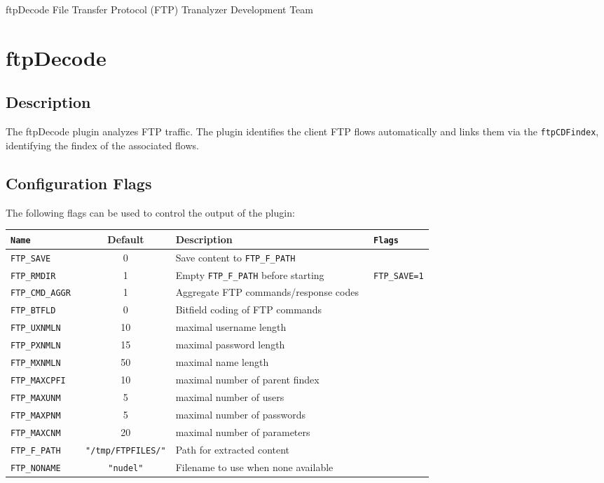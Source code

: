 \documentclass[documentation]{subfiles}
\begin{document}
\trantitle
    {ftpDecode}
    {File Transfer Protocol (FTP)}
    {Tranalyzer Development Team} %

\section{ftpDecode}\label{s:ftpDecode}

\subsection{Description}
The ftpDecode plugin analyzes FTP traffic.
The plugin identifies the client FTP flows automatically and links them via the {\tt ftpCDFindex}, identifying
the findex of the associated flows.

\subsection{Configuration Flags}
The following flags can be used to control the output of the plugin:
\begin{longtable}{>{\tt}lcl>{\tt\small}l}
    \toprule
    {\bf Name} & {\bf Default} & {\bf Description} & {\bf Flags}\\
    \midrule\endhead%
    FTP\_SAVE      &  0 & Save content to {\tt FTP\_F\_PATH}       & \\
    FTP\_RMDIR     &  1 & Empty {\tt FTP\_F\_PATH} before starting & FTP\_SAVE=1\\
    FTP\_CMD\_AGGR &  1 & Aggregate FTP commands/response codes    & \\
    FTP\_BTFLD     &  0 & Bitfield coding of FTP commands          & \\
    FTP\_UXNMLN    & 10 & maximal username length                  & \\
    FTP\_PXNMLN    & 15 & maximal password length                  & \\
    FTP\_MXNMLN    & 50 & maximal name length                      & \\
    FTP\_MAXCPFI   & 10 & maximal number of parent findex          & \\
    FTP\_MAXUNM    &  5 & maximal number of users                  & \\
    FTP\_MAXPNM    &  5 & maximal number of passwords              & \\
    FTP\_MAXCNM    & 20 & maximal number of parameters             & \\

    FTP\_F\_PATH  & {\tt\small "/tmp/FTPFILES/"} & Path for extracted content\\
    FTP\_NONAME   & {\tt\small "nudel"}          & Filename to use when none available\\
    \bottomrule
\end{longtable}
\end{document}
